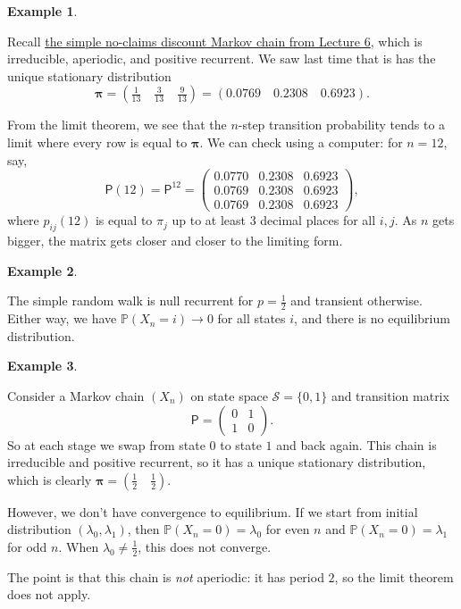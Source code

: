 \documentclass[
  a4paper,
]{article}
\theoremstyle{definition}
\theoremstyle{definition}
\newtheorem{example}{Example}[section]
\theoremstyle{definition}
\theoremstyle{remark}
\begin{document}
\begin{example}
\protect\hypertarget{exm:conv2}{}\label{exm:conv2}

Recall \protect\hyperlink{S06-example1}{the simple no-claims discount Markov chain from Lecture 6}, which is irreducible, aperiodic, and positive recurrent. We saw last time that is has the unique stationary distribution
\[ \boldsymbol\pi = \left(\tfrac1{13} \quad \tfrac{3}{13}\quad \tfrac9{13}\right) = (0.0769\quad 0.2308\quad 0.6923) . \]

From the limit theorem, we see that the \(n\)-step transition probability tends to a limit where every row is equal to \(\boldsymbol\pi\). We can check using a computer: for \(n = 12\), say,
\[ \mathsf P(12) = \mathsf P^{12} = \begin{pmatrix} 0.0770 & 0.2308 & 0.6923 \\ 0.0769 & 0.2308 & 0.6923 \\ 0.0769 & 0.2308 & 0.6923 \end{pmatrix}, \]
where \(p_{ij}(12)\) is equal to \(\pi_j\) up to at least 3 decimal places for all \(i,j\). As \(n\) gets bigger, the matrix gets closer and closer to the limiting form.

\end{example}

\begin{example}
\protect\hypertarget{exm:conv-rw}{}\label{exm:conv-rw}

The simple random walk is null recurrent for \(p = \frac12\) and transient otherwise. Either way, we have \(\mathbb P(X_n = i) \to 0\) for all states \(i\), and there is no equilibrium distribution.

\end{example}

\begin{example}
\protect\hypertarget{exm:conv4}{}\label{exm:conv4}

Consider a Markov chain \((X_n)\) on state space \(\mathcal S = \{0,1\}\) and transition matrix
\[ \mathsf P = \begin{pmatrix} 0 & 1 \\ 1 & 0 \end{pmatrix} . \]
So at each stage we swap from state \(0\) to state \(1\) and back again. This chain is irreducible and positive recurrent, so it has a unique stationary distribution, which is clearly \(\boldsymbol\pi = (\frac12\quad\frac12)\).

However, we don't have convergence to equilibrium. If we start from initial distribution \((\lambda_0, \lambda_1)\), then \(\mathbb P(X_n = 0) = \lambda_0\) for even \(n\) and \(\mathbb P(X_n = 0) = \lambda_1\) for odd \(n\). When \(\lambda_0 \neq \frac12\), this does not converge.

The point is that this chain is \emph{not} aperiodic: it has period \(2\), so the limit theorem does not apply.

\end{example}
\end{document}
